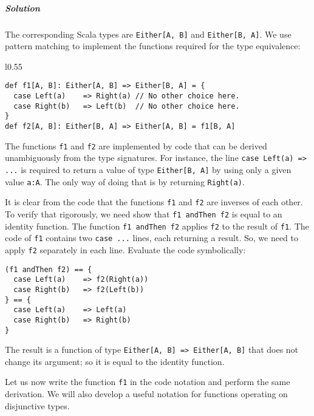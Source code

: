 \subparagraph{Solution}

The corresponding Scala types are \lstinline!Either[A, B]! and \lstinline!Either[B, A]!.
We use pattern matching to implement the functions required for the
type equivalence:

\begin{wrapfigure}{l}{0.55\columnwidth}%
\vspace{-0.86\baselineskip}
\begin{lstlisting}
def f1[A, B]: Either[A, B] => Either[B, A] = {
  case Left(a)    => Right(a) // No other choice here.
  case Right(b)   => Left(b)  // No other choice here.
}
def f2[A, B]: Either[B, A] => Either[A, B] = f1[B, A]
\end{lstlisting}

\vspace{-1.2\baselineskip}
\end{wrapfigure}%
The functions \lstinline!f1! and \lstinline!f2! are implemented
by code that can be derived unambiguously from the type signatures.
For instance, the line \lstinline!case Left(a) => ...! is required
to return a value of type \lstinline!Either[B, A]! by using only
a given value \lstinline!a:A!. The only way of doing that is by returning
\lstinline!Right(a)!.

It is clear from the code that the functions \lstinline!f1! and \lstinline!f2!
are inverses of each other. To verify that rigorously, we need show
that \lstinline!f1 andThen f2! is equal to an identity function.
The function \lstinline!f1 andThen f2! applies \lstinline!f2! to
the result of \lstinline!f1!. The code of \lstinline!f1! contains
two \lstinline!case ...! lines, each returning a result. So, we need
to apply \lstinline!f2! separately in each line. Evaluate the code
symbolically:
\begin{lstlisting}
(f1 andThen f2) == {
  case Left(a)    => f2(Right(a))
  case Right(b)   => f2(Left(b))
} == {
  case Left(a)    => Left(a)
  case Right(b)   => Right(b)
}
\end{lstlisting}
The result is a function of type \lstinline!Either[A, B] => Either[A, B]!
that does not change its argument; so it is equal to the identity
function. 

Let us now write the function \lstinline!f1! in the code notation
and perform the same derivation. We will also develop a useful notation
for functions operating on disjunctive types.

